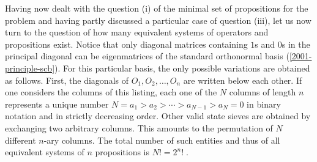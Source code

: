 Having now dealt with the question (i) of the minimal set of propositions
for the  problem and having partly discussed a particular case of
question (iii), let us now turn to the question of how many equivalent systems
of operators and propositions exist.
Notice that only diagonal matrices containing $1$s and $0$s
in the principal diagonal can be eigenmatrices of the standard
orthonormal basis (\ref{2001-principle-scb}).
For this particular basis, the only possible variations are obtained as follows.
First, the diagonals of $O_1,O_2,\ldots ,O_n$ are written below each other.
If one considers the columns of this listing,
each one of the $N$ columns of length $n$ represents a unique number
$N= a_1> a_2> \cdots > a_{N-1}> a_N =0$
in binary notation and in strictly decreasing order.
Other valid state sieves are obtained by exchanging two arbitrary columns.
This amounts to the permutation of $N$ different $n$-ary columns.
The total number of such entities and thus of all equivalent systems of $n$ propositions
is $N!=2^n!\;$.


